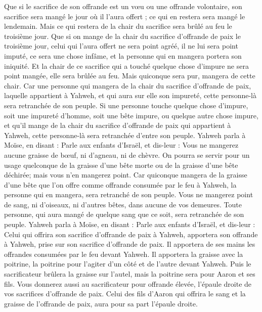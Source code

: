 \begin{multicols}{2}
Que si le sacrifice de son offrande est un vœu ou une offrande volontaire, son sacrifice sera mangé le jour où il l'aura offert ; ce qui en restera sera mangé le lendemain.
Mais ce qui restera de la chair du sacrifice sera brûlé au feu le troisième jour.
Que si on mange de la chair du sacrifice d'offrande de paix le troisième jour, celui qui l'aura offert ne sera point agréé, il ne lui sera point imputé, ce sera une chose infâme, et la personne qui en mangera portera son iniquité.
Et la chair de ce sacrifice qui a touché quelque chose d'impure ne sera point mangée, elle sera brûlée au feu. Mais quiconque sera pur, mangera de cette chair.
Car une personne qui mangera de la chair du sacrifice d'offrande de paix, laquelle appartient à Yahweh, et qui aura sur elle son impureté, cette personne-là sera retranchée de son peuple.
Si une personne touche quelque chose d'impure, soit une impureté d'homme, soit une bête impure, ou quelque autre chose impure, et qu'il mange de la chair du sacrifice d'offrande de paix qui appartient à Yahweh, cette personne-là sera retranchée d'entre son peuple.
Yahweh parla à Moïse, en disant :
Parle aux enfants d'Israël, et dis-leur : Vous ne mangerez aucune graisse de bœuf, ni d'agneau, ni de chèvre.
On pourra se servir pour un usage quelconque de la graisse d'une bête morte ou de la graisse d'une bête déchirée; mais vous n'en mangerez point.
Car quiconque mangera de la graisse d'une bête que l'on offre comme offrande consumée par le feu à Yahweh, la personne qui en mangera, sera retranché de son peuple.
Vous ne mangerez point de sang, ni d'oiseaux, ni d'autres bêtes, dans aucune de vos demeures.
Toute personne, qui aura mangé de quelque sang que ce soit, sera retranchée de son peuple.
Yahweh parla à Moïse, en disant :
Parle aux enfants d'Israël, et dis-leur : Celui qui offrira son sacrifice d'offrande de paix à Yahweh, apportera son offrande à Yahweh, prise sur son sacrifice d'offrande de paix.
Il apportera de ses mains les offrandes consumées par le feu devant Yahweh. Il apportera la graisse avec la poitrine, la poitrine pour l'agiter d'un côté et de l'autre devant Yahweh.
Puis le sacrificateur brûlera la graisse sur l'autel, mais la poitrine sera pour Aaron et ses fils.
Vous donnerez aussi au sacrificateur pour offrande élevée, l'épaule droite de vos sacrifices d'offrande de paix.
Celui des fils d'Aaron qui offrira le sang et la graisse de l'offrande de paix, aura pour sa part l'épaule droite.

\end{multicols}
